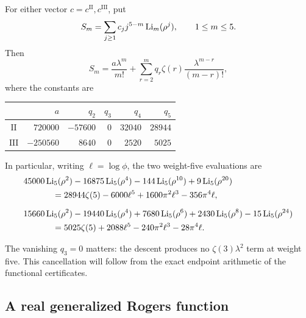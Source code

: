 \begin{theorem}
\label{gold:thm:main}
For either vector $c=c^{\mathrm{II}},c^{\mathrm{III}}$, put
\[
 S_m=\sum_{j\ge1}c_jj^{5-m}\operatorname{Li}_m(\rho^j),\qquad 1\le m\le5.
\]
Then
\begin{equation}
 S_m=\frac{a\lambda^m}{m!}
     +\sum_{r=2}^{m}q_r\zeta(r)\frac{\lambda^{m-r}}{(m-r)!},
 \label{gold:eq:all-weights}
\end{equation}
where the constants are
\begin{center}
\begin{tabular}{c|rrrrr}
 & $a$ & $q_2$ & $q_3$ & $q_4$ & $q_5$\\ \hline
 $\mathrm{II}$ & $720000$ & $-57600$ & $0$ & $32040$ & $28944$\\
 $\mathrm{III}$ & $-250560$ & $8640$ & $0$ & $2520$ & $5025$
\end{tabular}
\end{center}
In particular, writing $\ell=\log\phi$, the two weight-five evaluations are
\begin{align}
 &45000\Li_5(\rho^2)-16875\Li_5(\rho^4)
       -144\Li_5(\rho^{10})+9\Li_5(\rho^{20})\notag\\
 &\hspace{12mm}=28944\zeta(5)-6000\ell^5
           +1600\pi^2\ell^3-356\pi^4\ell,
 \label{gold:eq:II-five}\\[2mm]
 &15660\Li_5(\rho^2)-19440\Li_5(\rho^4)
       +7680\Li_5(\rho^6)+2430\Li_5(\rho^8)
       -15\Li_5(\rho^{24})\notag\\
 &\hspace{12mm}=5025\zeta(5)+2088\ell^5
          -240\pi^2\ell^3-28\pi^4\ell.
 \label{gold:eq:III-five}
\end{align}
\end{theorem}

The vanishing $q_3=0$ matters: the descent produces no
$\zeta(3)\lambda^2$ term at weight five.  This cancellation will follow
from the exact endpoint arithmetic of the functional certificates.

\subsection{A real generalized Rogers function}

